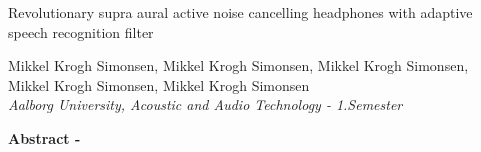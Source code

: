 
\begin{center}
\begin{huge}
Revolutionary supra aural active noise cancelling headphones with adaptive speech recognition filter
\end{huge}

\vspace{5mm}
Mikkel Krogh Simonsen, Mikkel Krogh Simonsen, Mikkel Krogh Simonsen, Mikkel Krogh Simonsen, Mikkel Krogh Simonsen
\\
\textit{Aalborg University, Acoustic and Audio Technology - 1.Semester}


\vspace{5mm}

\textbf{Abstract -} \lipsum[2]



\end{center}